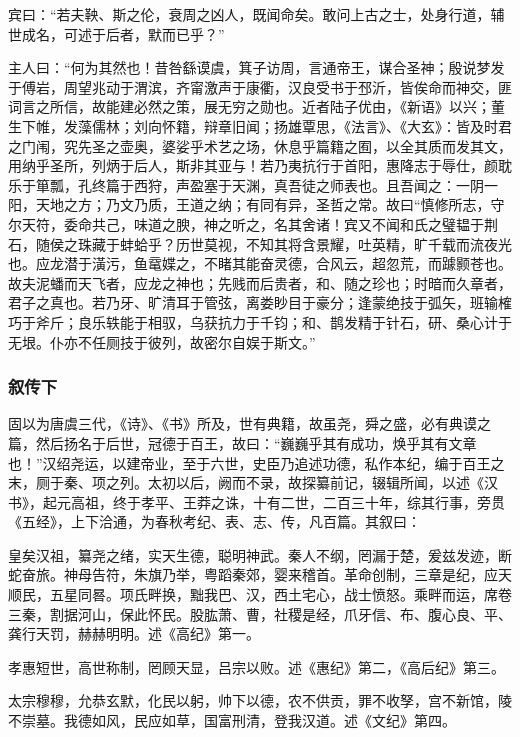 \documentclass[]{article}
\begin{document}
宾曰：``若夫鞅、斯之伦，衰周之凶人，既闻命矣。敢问上古之士，处身行道，辅世成名，可述于后者，默而已乎？''

主人曰：``何为其然也！昔咎繇谟虞，箕子访周，言通帝王，谋合圣神；殷说梦发于傅岩，周望兆动于渭滨，齐甯激声于康衢，汉良受书于邳沂，皆俟命而神交，匪词言之所信，故能建必然之策，展无穷之勋也。近者陆子优由，《新语》以兴；董生下帷，发藻儒林；刘向怀籍，辩章旧闻；扬雄覃思，《法言》、《大玄》：皆及时君之门闱，究先圣之壶奥，婆娑乎术艺之场，休息乎篇籍之囿，以全其质而发其文，用纳乎圣所，列炳于后人，斯非其亚与！若乃夷抗行于首阳，惠降志于辱仕，颜耽乐于箪瓢，孔终篇于西狩，声盈塞于天渊，真吾徒之师表也。且吾闻之：一阴一阳，天地之方；乃文乃质，王道之纳；有同有异，圣哲之常。故曰``慎修所志，守尔天符，委命共己，味道之腴，神之听之，名其舍诸！宾又不闻和氏之璧韫于荆石，随侯之珠藏于蚌蛤乎？历世莫视，不知其将含景耀，吐英精，旷千载而流夜光也。应龙潜于潢污，鱼鼋媟之，不睹其能奋灵德，合风云，超忽荒，而躆颢苍也。故夫泥蟠而天飞者，应龙之神也；先贱而后贵者，和、随之珍也；时暗而久章者，君子之真也。若乃牙、旷清耳于管弦，离娄眇目于豪分；逢蒙绝技于弧矢，班输榷巧于斧斤；良乐轶能于相驭，乌获抗力于千钧；和、鹊发精于针石，研、桑心计于无垠。仆亦不任厕技于彼列，故密尔自娱于斯文。''

\hypertarget{header-n7029}{%
\subsubsection{叙传下}\label{header-n7029}}

固以为唐虞三代，《诗》、《书》所及，世有典籍，故虽尧，舜之盛，必有典谟之篇，然后扬名于后世，冠德于百王，故曰：``巍巍乎其有成功，焕乎其有文章也！''汉绍尧运，以建帝业，至于六世，史臣乃追述功德，私作本纪，编于百王之末，厕于秦、项之列。太初以后，阙而不录，故探纂前记，辍辑所闻，以述《汉书》，起元高祖，终于孝平、王莽之诛，十有二世，二百三十年，综其行事，旁贯《五经》，上下洽通，为春秋考纪、表、志、传，凡百篇。其叙曰：

皇矣汉祖，纂尧之绪，实天生德，聪明神武。秦人不纲，罔漏于楚，爰兹发迹，断蛇奋旅。神母告符，朱旗乃举，粤蹈秦郊，婴来稽首。革命创制，三章是纪，应天顺民，五星同晷。项氏畔换，黜我巴、汉，西土宅心，战士愤怒。乘畔而运，席卷三秦，割据河山，保此怀民。股肱萧、曹，社稷是经，爪牙信、布、腹心良、平、龚行天罚，赫赫明明。述《高纪》第一。

孝惠短世，高世称制，罔顾天显，吕宗以败。述《惠纪》第二，《高后纪》第三。

太宗穆穆，允恭玄默，化民以躬，帅下以德，农不供贡，罪不收孥，宫不新馆，陵不崇墓。我德如风，民应如草，国富刑清，登我汉道。述《文纪》第四。
\end{document}
